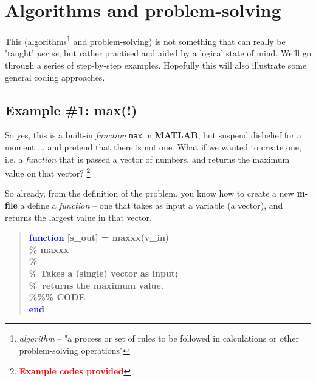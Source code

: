 \documentclass{tufte-book} %
\newenvironment{docspecbold}{\begin{quotation}\ttfamily\bfseries\parskip0pt\parindent0pt\ignorespaces}{\end{quotation}}
\begin{document}

\newpage


\section{Algorithms and problem-solving}

This (algorithms\footnote{\textit{algorithm} -- "a process or set of rules to be followed in calculations or other problem-solving operations"}  and problem-solving) is not something that can really be 'taught' \textit{per se}, but rather practised and aided by a logical state of mind. We'll go through a series of step-by-step examples. Hopefully this will also illustrate some general coding approaches.


\subsection{Example \#1: max(!)}

So yes, this is a built-in \textit{function} \texttt{max} in \textbf{MATLAB}, but suspend disbelief for a moment ... and pretend that there is not one. What if we wanted to create one, i.e. a \textit{function} that is passed a vector of numbers, and returns the maximum value on that vector? \footnote{\textcolor{red}{\textbf{Example codes provided}}}

So already, from the definition of the problem, you know how to create a new \textbf{m-file} a define a \textit{function} -- one that takes as input a variable (a vector), and returns the largest value in that vector.
\begin{docspecbold}
\textcolor{blue}{function} [s\_out] = maxxx(v\_in)\\
\textcolor[rgb]{0,0.501961,0}{\% maxxx\\
\%\\
\% Takes a (single) vector as input;\\ \%\ returns the maximum value.}\\
\textcolor[rgb]{0,0.501961,0}{\%\%\% CODE} \\
\textcolor{blue}{end}
\end{docspecbold}
\end{document}
